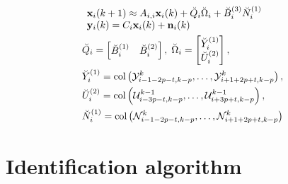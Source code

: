 \documentclass[journal,10pt]{IEEEtran}
\begin{document}
\begin{small}
\begin{align}
&\begin{array}{l}
\mathbf{x}_{i}(k+1) \approx A_{i,i}\mathbf{x}_{i}(k)+\breve{Q}_{i}\breve{\Omega}_{i}+\breve{B}_{i}^{(3)}\breve{N}_{i}^{(1)} \\
\mathbf{y}_{i}(k)=C_{i}\mathbf{x}_{i}(k)+ \mathbf{n}_{i}(k)  
\end{array}
\label{unifiedSys} \\
&\breve{Q}_{i}=\begin{bmatrix} \breve{B}_{i}^{(1)} & \breve{B}_{i}^{(2)} \end{bmatrix},\;
\breve{\Omega}_{i}=\begin{bmatrix} \breve{Y}_{i}^{(1)} \\ \breve{U}_{i}^{(2)}   \end{bmatrix},\; \notag \\
& \breve{Y}_{i}^{(1)}=\text{col}\left(\mathcal{Y}_{i-1-2p-t,k-p}^{k}, \ldots, \mathcal{Y}_{i+1+2p+t,k-p}^{k} \right),\; \notag \\
& \breve{U}_{i}^{(2)}=\text{col}\left( \mathcal{U}_{i-3p-t,k-p}^{k-1}, \ldots , \mathcal{U}_{i+3p+t,k-p}^{k-1} \right), \notag \\ &\breve{N}_{i}^{(1)}=\text{col}\left( \mathcal{N}_{i-1-2p-t,k-p}^{k}, \ldots ,\mathcal{N}_{i+1+2p+t,k-p}^{k} \right)
\label{finalIdentificationModel}
\end{align}
\end{small}
\section{Identification algorithm}
\label{identSection}
\end{document}

